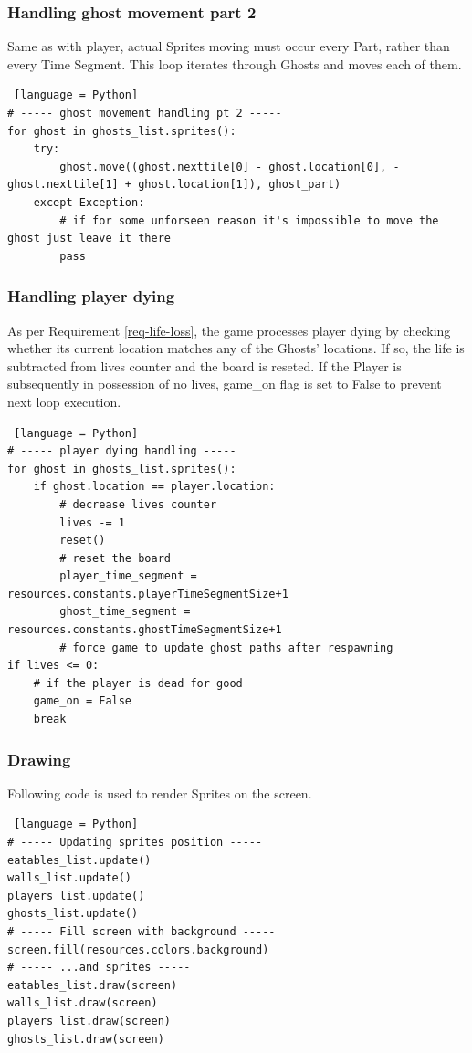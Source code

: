 \documentclass[11pt,a4paper,notitlepage]{report}
\begin{document}
				\subsubsection{Handling ghost movement part 2}
					Same as with player, actual Sprites moving must occur every Part, rather than every Time Segment. This loop iterates through Ghosts and moves each of them.
					\begin{lstlisting} [language = Python]
# ----- ghost movement handling pt 2 -----
for ghost in ghosts_list.sprites():
	try:
		ghost.move((ghost.nexttile[0] - ghost.location[0], -ghost.nexttile[1] + ghost.location[1]), ghost_part)
	except Exception:
		# if for some unforseen reason it's impossible to move the ghost just leave it there
		pass
					\end{lstlisting}
				\subsubsection{Handling player dying}
					As per Requirement \ref{req-life-loss}, the game processes player dying by checking whether its current location matches any of the Ghosts' locations. If so, the life is subtracted from lives counter and the board is reseted. If the Player is subsequently in possession of no lives, game\_on flag is set to False to prevent next loop execution.
					\begin{lstlisting} [language = Python]
# ----- player dying handling -----
for ghost in ghosts_list.sprites():
	if ghost.location == player.location:
		# decrease lives counter
		lives -= 1
		reset()
		# reset the board
		player_time_segment = resources.constants.playerTimeSegmentSize+1
		ghost_time_segment = resources.constants.ghostTimeSegmentSize+1
		# force game to update ghost paths after respawning
if lives <= 0:
	# if the player is dead for good
	game_on = False
	break
					\end{lstlisting}
				\subsubsection{Drawing}
					Following code is used to render Sprites on the screen.
					\begin{lstlisting} [language = Python]
# ----- Updating sprites position -----
eatables_list.update()
walls_list.update()
players_list.update()
ghosts_list.update()
# ----- Fill screen with background -----
screen.fill(resources.colors.background)
# ----- ...and sprites -----
eatables_list.draw(screen)
walls_list.draw(screen)
players_list.draw(screen)
ghosts_list.draw(screen)
					\end{lstlisting}
\end{document}
